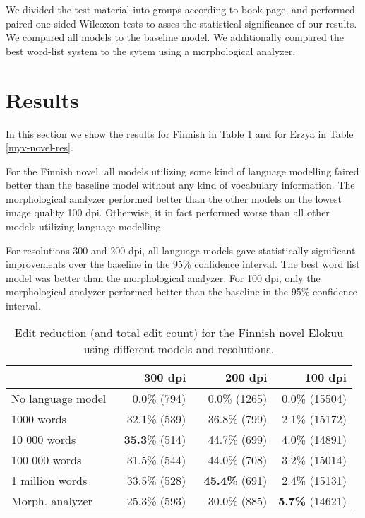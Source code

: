 \documentclass[b5paper]{article}
\begin{document}
We divided the test material into groups according to book page, and
performed paired one sided Wilcoxon tests to asses the statistical
significance of our results. We compared all models to the baseline
model. We additionally compared the best word-list system to the sytem
using a morphological analyzer.

\section{Results}
\label{res}
In this section we show the results for Finnish in Table
\ref{fin-novel-res} and for Erzya in Table
\ref{myv-novel-res}. 

For the Finnish novel, all models utilizing some kind of language
modelling faired better than the baseline model without any kind of
vocabulary information. The morphological analyzer performed better
than the other models on the lowest image quality 100 dpi. Otherwise,
it in fact performed worse than all other models utilizing language
modelling.

For resolutions 300 and 200 dpi, all language models gave
statistically significant improvements over the baseline in the 95\%
confidence interval. The best word list model was better than the
morphological analyzer. For 100 dpi, only the morphological analyzer
performed better than the baseline in the 95\% confidence interval.

\begin{table}[!htb]
\begin{center}
\begin{tabular}{lrrr}
\hline 
                  & 300 dpi & 200 dpi & 100 dpi \\
\hline 
No language model & ~0.0\% (794)          & ~0.0\% (1265)          & 0.0\% (15504)  \\
1000 words        & ~32.1\% (539)  & ~36.8\% (799)        & 2.1\% (15172)           \\
10 000 words      & {\bf ~35.3}\% (514)  & ~44.7\%  (699)  & 4.0\% (14891)          \\
100 000 words     & ~31.5\% (544)   & ~44.0\%  (708)  & 3.2\%  (15014)              \\
1 million words   & ~33.5\% (528)   & {\bf ~45.4\%} (691)  & 2.4\% (15131)          \\
Morph. analyzer   & ~25.3\% (593)    & ~30.0\% (885)     & {\bf 5.7\%} (14621)      \\
\hline 
\end{tabular}
\caption{Edit reduction (and total edit count) for the Finnish novel Elokuu using different models and resolutions.}\label{fin-novel-res}
\end{center}
\end{table}
\end{document}

